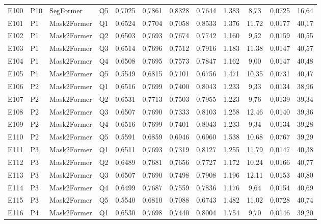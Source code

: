 \begin{longtable}{lllllccccccc}
E100 & P10 & SegFormer & Q5 & 0{,}7025 & 0{,}7861 & 0{,}8328 & 0{,}7644 & 1{,}383 & 8{,}73 & 0{,}0725 & 16{,}64 \\
E101 & P1 & Mask2Former & Q1 & 0{,}6524 & 0{,}7704 & 0{,}7058 & 0{,}8533 & 1{,}376 & 11{,}72 & 0{,}0177 & 40{,}17 \\
E102 & P1 & Mask2Former & Q2 & 0{,}6503 & 0{,}7693 & 0{,}7674 & 0{,}7742 & 1{,}160 & 9{,}52 & 0{,}0159 & 40{,}55 \\
E103 & P1 & Mask2Former & Q3 & 0{,}6514 & 0{,}7696 & 0{,}7512 & 0{,}7916 & 1{,}183 & 11{,}38 & 0{,}0147 & 40{,}57 \\
E104 & P1 & Mask2Former & Q4 & 0{,}6508 & 0{,}7695 & 0{,}7573 & 0{,}7847 & 1{,}162 & 9{,}00 & 0{,}0147 & 40{,}48 \\
E105 & P1 & Mask2Former & Q5 & 0{,}5549 & 0{,}6815 & 0{,}7101 & 0{,}6756 & 1{,}471 & 10{,}35 & 0{,}0731 & 40{,}47 \\
E106 & P2 & Mask2Former & Q1 & 0{,}6516 & 0{,}7699 & 0{,}7400 & 0{,}8043 & 1{,}233 & 9{,}33 & 0{,}0134 & 38{,}96 \\
E107 & P2 & Mask2Former & Q2 & 0{,}6531 & 0{,}7713 & 0{,}7503 & 0{,}7955 & 1{,}223 & 9{,}76 & 0{,}0139 & 39{,}34 \\
E108 & P2 & Mask2Former & Q3 & 0{,}6507 & 0{,}7690 & 0{,}7333 & 0{,}8103 & 1{,}258 & 12{,}46 & 0{,}0140 & 39{,}36 \\
E109 & P2 & Mask2Former & Q4 & 0{,}6516 & 0{,}7699 & 0{,}7401 & 0{,}8043 & 1{,}233 & 9{,}34 & 0{,}0134 & 39{,}28 \\
E110 & P2 & Mask2Former & Q5 & 0{,}5591 & 0{,}6859 & 0{,}6946 & 0{,}6960 & 1{,}538 & 10{,}68 & 0{,}0767 & 39{,}29 \\
E111 & P3 & Mask2Former & Q1 & 0{,}6511 & 0{,}7693 & 0{,}7319 & 0{,}8127 & 1{,}255 & 11{,}79 & 0{,}0147 & 40{,}38 \\
E112 & P3 & Mask2Former & Q2 & 0{,}6489 & 0{,}7681 & 0{,}7656 & 0{,}7727 & 1{,}172 & 10{,}24 & 0{,}0166 & 40{,}77 \\
E113 & P3 & Mask2Former & Q3 & 0{,}6507 & 0{,}7690 & 0{,}7498 & 0{,}7908 & 1{,}196 & 12{,}11 & 0{,}0153 & 40{,}80 \\
E114 & P3 & Mask2Former & Q4 & 0{,}6499 & 0{,}7687 & 0{,}7559 & 0{,}7836 & 1{,}176 & 9{,}64 & 0{,}0154 & 40{,}69 \\
E115 & P3 & Mask2Former & Q5 & 0{,}5540 & 0{,}6810 & 0{,}7088 & 0{,}6743 & 1{,}482 & 11{,}02 & 0{,}0728 & 40{,}74 \\
E116 & P4 & Mask2Former & Q1 & 0{,}6530 & 0{,}7698 & 0{,}7440 & 0{,}8004 & 1{,}754 & 9{,}70 & 0{,}0146 & 39{,}20 \\

\end{longtable}
